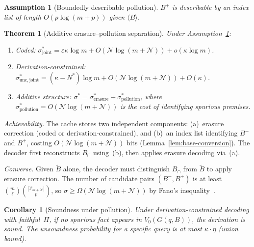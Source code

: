 \documentclass[journal]{IEEEtran}
\makeatletter
\newtheorem{assumption}{Assumption}[section]
\newtheorem{theorem}{Theorem}[section]
\newtheorem{corollary}{Corollary}[section]
\numberwithin{equation}{section}
\renewenvironment{proof}[1][\proofname]{\par
  \pushQED{\qed}%
  \normalfont \topsep6\p@\@plus6\p@\relax
  \trivlist
  \item[\hskip\labelsep
        \itshape
    #1\@addpunct{.}]\ignorespaces
}{%
  \popQED\endtrivlist\@endpefalse
}
\makeatother
\begin{document}
\begin{assumption}[Boundedly describable pollution]
\label{assump:describable-pollution}
$B^+$ is describable by an index list of length
$O(p\log(m{+}p))$ given $\langle B\rangle$.
\end{assumption}

\begin{theorem}[Additive erasure--pollution separation]
\label{thm:joint-separation}
Under Assumption~\textup{\ref{assump:describable-pollution}}:

\begin{enumerate}[label=\textup{(\Roman*)}]
\item \emph{Coded:}\;
$\sigma^*_{\mathrm{joint}}
=\varepsilon\kappa\log m
+O(\mathcal N\log(m{+}\mathcal N))
+o(\kappa\log m)$.

\item \emph{Derivation-constrained:}\;
$\sigma^*_{\mathrm{unc,joint}}
=(\kappa{-}N^*)\log m
+O(\mathcal N\log(m{+}\mathcal N))
+O(\kappa)$.

\item \emph{Additive structure:}\;
$\sigma^*=\sigma^*_{\mathrm{erasure}}
+\sigma^*_{\mathrm{pollution}}$,
where
$\sigma^*_{\mathrm{pollution}}
=O(\mathcal N\log(m{+}\mathcal N))$
is the cost of identifying spurious premises.
\end{enumerate}
\end{theorem}

\begin{proof}
\emph{Achievability.}\;
The cache stores two independent components:
(a)~erasure correction (coded or derivation-constrained), and
(b)~an index list identifying $B^-$ and $B^+$, costing
$O(\mathcal N\log(m{+}\mathcal N))$ bits
(Lemma~\ref{lem:base-conversion}).
The decoder first reconstructs $B_\cap$ using~(b),
then applies erasure decoding via~(a).

\emph{Converse.}\;
Given $\tilde B$ alone, the decoder must distinguish
$B_\cap$ from $\tilde B$ to apply erasure correction.
The number of candidate pairs $(B^-,B^+)$ is at least
$\binom{m}{\ell}\binom{|\mathcal V_{m+\mathcal N}|}{p}$,
so $\sigma\ge\Omega(\mathcal N\log(m{+}\mathcal N))$
by Fano's inequality~\cite[Ch.~2]{cover2006elements}.
\end{proof}

\begin{corollary}[Soundness under pollution]
\label{cor:soundness-pollution}
Under derivation-constrained decoding with faithful~$\Pi$,
if no spurious fact appears in $V_0(G(q,B))$, the derivation
is sound.
The unsoundness probability for a specific query is at most
$\kappa\cdot\eta$ \textup{(union bound)}.
\end{corollary}
\end{document}
